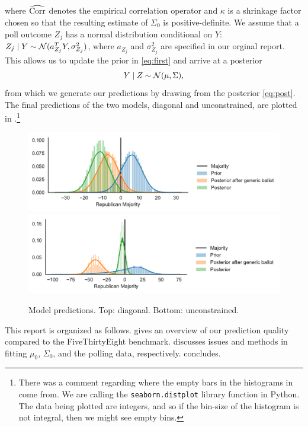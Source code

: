 \documentclass[12pt]{article}
\newcommand{\cm}{{\color{Red}{\textsf{[C]}}}}
\begin{document}
where $\widehat{\operatorname{Corr}}$ denotes the empirical correlation operator and $\kappa$ is a shrinkage factor chosen so that the resulting estimate of $\Sigma_0$ is positive-definite. We assume that a poll outcome $Z_j$ has a normal distribution conditional on $Y$: $Z_j \mid Y \sim \mathcal{N}(a_{Z_j}^T Y, \sigma_{Z_j}^2)$, where $a_{Z_j}$ and $\sigma_{Z_j}^2$ are specified in our orginal report. This allows us to update the prior in \eqref{eq:first} and arrive at a posterior \begin{equation}
  Y \mid Z \sim \mathcal{N}(\mu, \Sigma),
  \label{eq:post}
\end{equation}
from which we generate our predictions by drawing from the posterior \eqref{eq:post}. The final predictions of the two models, diagonal and unconstrained, are plotted in .\footnote{\cm{} There was a comment regarding where the empty bars in the histograms in  come from. We are calling the \texttt{seaborn.distplot} library function in Python. The data being plotted are integers, and so if the bin-size of the histogram is not integral, then we might see empty bins. }
\begin{figure}[tbh]
  \centering
  \includegraphics[width=.7\textwidth]{rep_seats_with_diagonal_prior.pdf}
  \includegraphics[width=.7\textwidth]{rep_seats.pdf}
  \caption{Model predictions. Top: diagonal. Bottom: unconstrained. }
  \label{fig:model}
\end{figure}

This report is organized as follows.  gives an overview of our prediction quality compared to the FiveThirtyEight benchmark.  discusses issues and methods in fitting $\mu_0$, $\Sigma_0$, and the polling data, respectively.  concludes.
\end{document}
